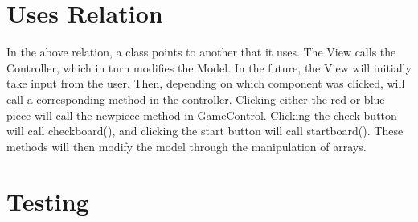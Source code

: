 \documentclass[12pt]{article}
\begin{document}
	\section{Uses Relation}
			\begin{figure}[!h]
				\centering
			\end{figure}
	In the above relation, a class points to another that it uses.
	The View calls the Controller, which in turn modifies the Model. In the future, the View will initially take input from the user. Then, depending on which component was clicked, will call a corresponding method in the controller. Clicking either the red or blue piece will call the newpiece method in GameControl. Clicking the check button will call checkboard(), and clicking the start button will call startboard(). These methods will then modify the model through the manipulation of arrays. \\
	\newpage	
	\section{Testing}
	
\end{document}
